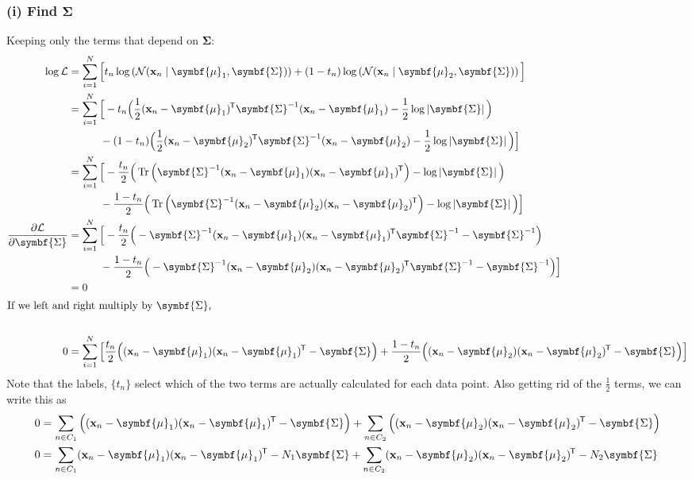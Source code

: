 \documentclass[11pt]{article}
\DeclareMathOperator{\Tr}{Tr}
\newcommand{\logdet}[1]{\log \left| {#1} \right| }
\newcommand{\xb}{\mathbf{x}}
\newcommand{\ub}{\symbf{\mu}}
\newcommand{\Sb}{\symbf{\Sigma}}
\newcommand*{\tran}{^{\mkern-1.5mu\mathsf{T}}}
\begin{document}
\begin{framed}
\subsubsection*{(i) Find $\Sb$}
Keeping only the terms that depend on $\Sb$:
\begin{align*}
	\log \mathcal{L} &=  \sum_{i=1}^{N} \Big[   t_n \log \left(\mathcal{N}(\xb_n \mid \ub_1, \Sb)\right)   +  (1 - t_n) \log \left(\mathcal{N}(\xb_n \mid \ub_2, \Sb)\right) \Big] \\
	& =  \sum_{i=1}^{N} \Big[   - t_n  \Big(\frac{1}{2} (\xb_n  - \ub_1)\tran \Sb^{-1} (\xb_n  - \ub_1)  - \frac{1}{2} \logdet{\Sb} \Big)   \\
	 & \quad \quad \quad  - (1 - t_n)  \Big( \frac{1}{2} (\xb_n  - \ub_2)\tran \Sb^{-1} (\xb_n  - \ub_2) - \frac{1}{2} \logdet{\Sb} \Big)  \Big]  \\
	 & =  \sum_{i=1}^{N} \Big[   -  \frac{t_n }{2} \Big( \Tr \Big(\Sb^{-1} (\xb_n  - \ub_1)  (\xb_n  - \ub_1)\tran \Big) - \logdet{\Sb} \Big)   \\
	 & \quad \quad \quad   - \frac{1 - t_n}{2}  \Big(   \Tr \Big(\Sb^{-1} (\xb_n  - \ub_2)  (\xb_n  - \ub_2)\tran \Big) - \logdet{\Sb} \Big)  \Big]  \\
	\frac{\partial \mathcal{L}}{\partial \Sb} &= 	  \sum_{i=1}^{N} \Big[   -  \frac{t_n }{2} \Big( - \Sb^{-1} (\xb_n  - \ub_1)  (\xb_n  - \ub_1)\tran \Sb^{-1}  - \Sb^{-1} \Big)   \\
	 & \quad \quad \quad   - \frac{1 - t_n}{2}  \Big(  - \Sb^{-1} (\xb_n  - \ub_2)  (\xb_n  - \ub_2)\tran \Sb^{-1} - \Sb^{-1} \Big)  \Big]  \\
	 & = 0 \\
\intertext{If we left and right multiply by $\Sb$,} \\
	0 &= \sum_{i=1}^{N} \Big[   \frac{t_n }{2} \Big(  (\xb_n  - \ub_1)  (\xb_n  - \ub_1)\tran  - \Sb \Big)   +  \frac{1 - t_n}{2}  \Big(  (\xb_n  - \ub_2)  (\xb_n  - \ub_2)\tran  - \Sb \Big)  \Big] 
 \end{align*}
Note that the labels, $\lbrace t_n\rbrace$ select which of the two terms are actually calculated for each data point. Also getting rid of the $\frac{1}{2}$ terms, we can write this as
\begin{align*}
	0 &= \sum_{n \in C_1} \Big(  (\xb_n  - \ub_1)  (\xb_n  - \ub_1)\tran  - \Sb \Big)   +  \sum_{n \in C_2}  \Big(  (\xb_n  - \ub_2)  (\xb_n  - \ub_2)\tran  - \Sb \Big)  \\
	0 &= \sum_{n \in C_1} (\xb_n  - \ub_1)  (\xb_n  - \ub_1)\tran  - N_1 \Sb  + \sum_{n \in C_2}  (\xb_n  - \ub_2)  (\xb_n  - \ub_2)\tran  - N_2 \Sb   \\

\end{align*}
\end{framed}
\end{document}
